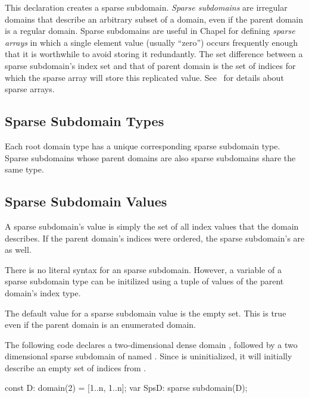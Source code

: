 This declaration creates a sparse subdomain.
 \emph{Sparse subdomains} are irregular domains that describe an
arbitrary subset of a domain, even if the parent domain is a regular
domain.  Sparse subdomains are useful in Chapel for
defining \emph{sparse arrays} in which a single element value (usually ``zero'')
 occurs
frequently enough that it is worthwhile to avoid storing it
redundantly.  The set difference between a sparse subdomain's index set
and that of parent domain is the set of indices for which the
sparse array will store this replicated value.
See~ for details about sparse arrays.

\subsection{Sparse Subdomain Types}

Each root domain type has a unique corresponding sparse subdomain
type.  Sparse subdomains whose parent domains are also sparse
subdomains share the same type.

\subsection{Sparse Subdomain Values}
\label{Sparse_Domain_Values}

A sparse subdomain's value is simply the set of all index values that
the domain describes.  If the parent domain's indices were ordered,
the sparse subdomain's are as well.

There is no literal syntax for an sparse subdomain.  However, a variable of a
sparse subdomain type can be initilized using a tuple of values
of the parent domain's index type.

The default value for a sparse subdomain value is the empty set.  This is true
even if the parent domain is an enumerated domain.

\begin{example}
The following code declares a two-dimensional dense domain ,
followed by a two dimensional sparse subdomain of 
named .  Since  is uninitialized, it will
initially describe an empty set of indices from .
\begin{chapel}
const D: domain(2) = [1..n, 1..n];
var SpsD: sparse subdomain(D);
\end{chapel}
\end{example}

